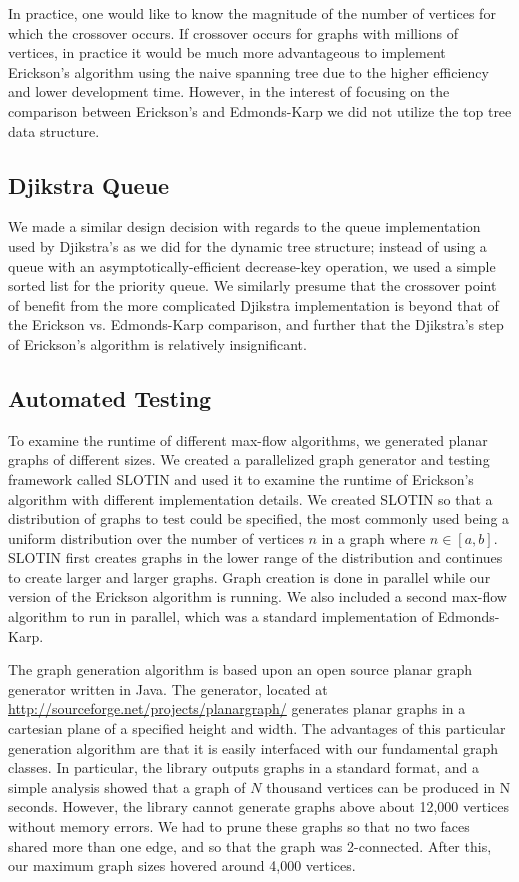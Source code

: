\documentclass[12pt]{article}
\begin{document}
In practice, one would like to know the magnitude of the number of vertices for which the crossover occurs. If crossover occurs for graphs with millions of vertices, in practice it would be much more advantageous to implement Erickson's algorithm using the naive spanning tree due to the higher efficiency and lower development time.  However, in the interest of focusing on the comparison between Erickson's and Edmonds-Karp we did not utilize the top tree data structure.

\subsection{Djikstra Queue}

We made a similar design decision with regards to the queue implementation used by Djikstra's as we did for the dynamic tree structure; instead of using a queue with an asymptotically-efficient decrease-key operation, we used a simple sorted list for the priority queue.  We similarly presume that the crossover point of benefit from the more complicated Djikstra implementation is beyond that of the Erickson vs. Edmonds-Karp comparison, and further that the Djikstra's step of Erickson's algorithm is relatively insignificant.

\subsection{Automated Testing}

To examine the runtime of different max-flow algorithms, we generated planar graphs of different sizes. We created a parallelized graph generator and testing framework called SLOTIN and used it to examine the runtime of Erickson's algorithm with different implementation details. We created SLOTIN so that a distribution of graphs to test could be specified, the most commonly used being a uniform distribution over the number of vertices $n$ in a graph where $n \in [a,b]$. SLOTIN first creates graphs in the lower range of the distribution and continues to create larger and larger graphs. Graph creation is done in parallel while our version of the Erickson algorithm is running. We also included a second max-flow algorithm to run in parallel, which was a standard implementation of Edmonds-Karp. 

The graph generation algorithm is based upon an open source planar graph generator written in Java. The generator, located at \url{http://sourceforge.net/projects/planargraph/} generates planar graphs in a cartesian plane of a specified height and width. The advantages of this particular generation algorithm are that it is easily interfaced with our fundamental graph classes. In particular, the library outputs graphs in a standard format, and a simple analysis showed that a graph of $N$ thousand vertices can be produced in N seconds. However, the library cannot generate graphs above about 12,000 vertices without memory errors.  We had to prune these graphs so that no two faces shared more than one edge, and so that the graph was 2-connected.  After this, our maximum graph sizes hovered around 4,000 vertices.
\end{document}
